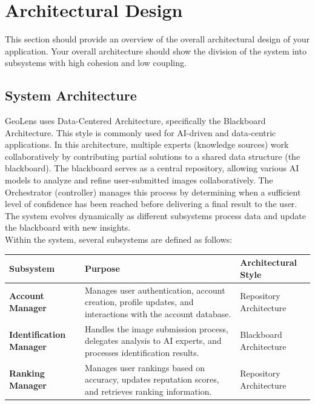 \documentclass[]{article}
\begin{document}
\section{Architectural Design}
\label{sec:architectural_design}
This section should provide an overview of the overall architectural design of your application. Your overall architecture should show the division of the system into subsystems with high cohesion and low coupling.

\subsection{System Architecture}
\label{sub:system_architecture}


GeoLens uses Data-Centered Architecture, specifically the Blackboard Architecture. This style is commonly used for AI-driven and data-centric applications. In this architecture, multiple experts (knowledge sources) work collaboratively by contributing partial solutions to a shared data structure (the blackboard). The blackboard serves as a central repository, allowing various AI models to analyze and refine user-submitted images collaboratively. The Orchestrator (controller) manages this process by determining when a sufficient level of confidence has been reached before delivering a final result to the user. The system evolves dynamically as different subsystems process data and update the blackboard with new insights.\\

\noindent Within the system, several subsystems are defined as follows:\\

\renewcommand{\arraystretch}{1.3} %
\begin{table}[h]
    \begin{tabular}{|p{4cm}|p{7cm}|p{4cm}|} 
        \hline
        \textbf{Subsystem} & \textbf{Purpose} & \textbf{Architectural Style} \\
        \hline
        \textbf{Account Manager} & Manages user authentication, account creation, profile updates, and interactions with the account database. & 
        Repository Architecture \\
        \hline
        \textbf{Identification Manager} & Handles the image submission process, delegates analysis to AI experts, and processes identification results. & Blackboard Architecture \\
        \hline
        \textbf{Ranking Manager} & Manages user rankings based on accuracy, updates reputation scores, and retrieves ranking information. & Repository Architecture \\
        \hline
    \end{tabular}
\end{table}
\end{document}
